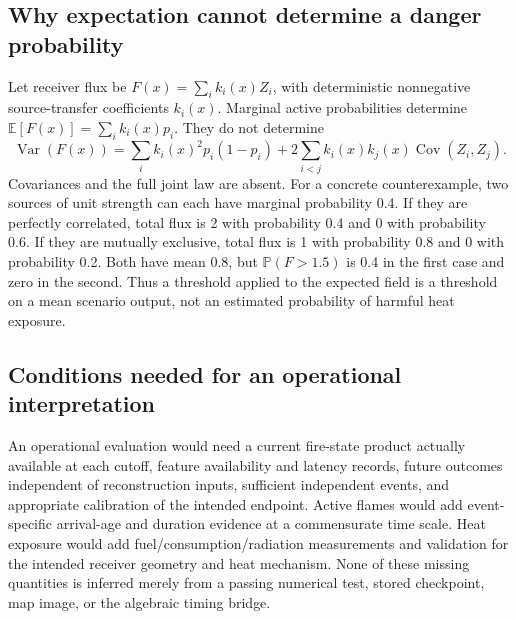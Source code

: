 \documentclass[11pt,a4paper]{article}
\newcommand{\E}{\mathbb{E}}
\DeclareMathOperator{\Var}{Var}
\DeclareMathOperator{\Cov}{Cov}
\begin{document}
\subsection{Why expectation cannot determine a danger probability}
Let receiver flux be $F(x)=\sum_i k_i(x)Z_i$, with deterministic nonnegative
source-transfer coefficients $k_i(x)$. Marginal active probabilities determine
$\E[F(x)]=\sum_i k_i(x)p_i$. They do not determine
\begin{equation}
\Var(F(x))=\sum_i k_i(x)^2p_i(1-p_i)
+2\sum_{i<j}k_i(x)k_j(x)\Cov(Z_i,Z_j).
\end{equation}
Covariances and the full joint law are absent. For a concrete counterexample,
two sources of unit strength can each have marginal probability 0.4. If they
are perfectly correlated, total flux is 2 with probability 0.4 and 0 with
probability 0.6. If they are mutually exclusive, total flux is 1 with
probability 0.8 and 0 with probability 0.2. Both have mean 0.8, but
$\mathbb P(F>1.5)$ is 0.4 in the first case and zero in the second.
Thus a threshold applied to the expected field is a threshold on a mean
scenario output, not an estimated probability of harmful heat exposure.

\subsection{Conditions needed for an operational interpretation}
An operational evaluation would need a current fire-state product actually
available at each cutoff, feature availability and latency records, future
outcomes independent of reconstruction inputs, sufficient independent events,
and appropriate calibration of the intended endpoint. Active flames would
add event-specific arrival-age and duration evidence at a commensurate time
scale. Heat exposure would add fuel/consumption/radiation measurements and
validation for the intended receiver geometry and heat mechanism. None of
these missing quantities is inferred merely from a passing numerical test,
stored checkpoint, map image, or the algebraic timing bridge.

\appendix
\end{document}
